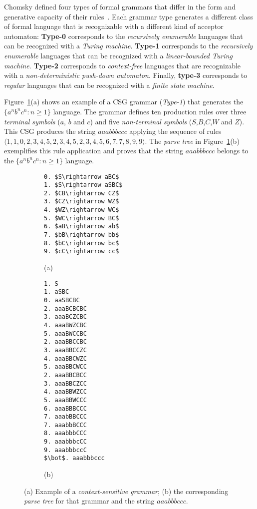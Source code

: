 \documentclass[letterpaper]{article} %
\newcommand{\tup}[1]{{\langle #1 \rangle}}
\begin{document}
Chomsky defined four types of formal grammars that differ in the form and generative capacity of their rules~\cite{chomsky2002syntactic}. Each grammar type generates a different class of formal language that is recognizable with a different kind of acceptor automaton: {\bf Type-0} corresponds to the {\em recursively enumerable} languages that can be recognized with a {\em Turing machine}. {\bf Type-1} corresponds to the {\em recursively enumerable} languages that can be recognized with a {\em linear-bounded Turing machine}. {\bf Type-2} corresponds to {\em context-free} languages that are recognizable with a {\em non-deterministic push-down automaton}. Finally, {\bf type-3} corresponds to {\em regular} languages that can be recognized with a {\em finite state machine}.

Figure~\ref{fig:csg}(a) shows an example of a CSG grammar ({\em Type-1}) that generates the $\{a^nb^nc^n : n \geq 1 \}$ language. The grammar defines ten production rules over three {\em terminal symbols} ($a$, $b$ and $c$) and five {\em non-terminal symbols} ($S$,$B$,$C$,$W$ and $Z$). This CSG produces the string $aaabbbccc$ applying the sequence of rules $\tup{1,1,0,2,3,4,5,2,3,4,5,2,3,4,5,6,7,7,8,9,9}$. The {\it parse tree} in Figure~\ref{fig:csg}(b) exemplifies this rule application and proves that the string $aaabbbccc$ belongs to the $\{a^nb^nc^n : n \geq 1 \}$ language.

\begin{figure}
    \begin{subfigure}[]{0.3\textwidth}
      \begin{lstlisting}
0. $S\rightarrow aBC$
1. $S\rightarrow aSBC$
2. $CB\rightarrow CZ$
3. $CZ\rightarrow WZ$
4. $WZ\rightarrow WC$
5. $WC\rightarrow BC$
6. $aB\rightarrow ab$
7. $bB\rightarrow bb$	
8. $bC\rightarrow bc$
9. $cC\rightarrow cc$     
      \end{lstlisting}

	\hspace*{1.8cm}(a)
  \end{subfigure}
  \begin{subfigure}[]{0.15\textwidth}
  \begin{tiny}  
\begin{lstlisting}
1. S
1. aSBC
0. aaSBCBC
2. aaaBCBCBC
3. aaaBCZCBC
4. aaaBWZCBC
5. aaaBWCCBC
2. aaaBBCCBC
3. aaaBBCCZC
4. aaaBBCWZC
5. aaaBBCWCC
2. aaaBBCBCC
3. aaaBBCZCC
4. aaaBBWZCC
5. aaaBBWCCC
6. aaaBBBCCC
7. aaabBBCCC
7. aaabbBCCC
8. aaabbbCCC
9. aaabbbcCC
9. aaabbbccC
$\bot$. aaabbbccc 
\end{lstlisting}
  \end{tiny}    
\hspace*{.3cm}(b)
  \end{subfigure}

  \caption{\small (a) Example of a {\em context-sensitive grammar}; (b) the corresponding {\it parse tree} for that grammar and the string $aaabbbccc$.}
  \label{fig:csg}
\end{figure}
\end{document}
